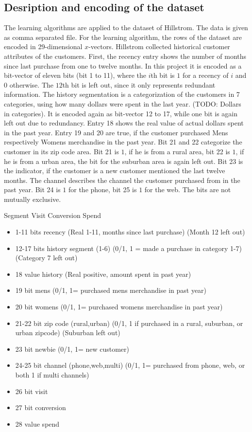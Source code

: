 \documentclass[10pt,twocolumn,letterpaper]{article}
\begin{document}
\subsection{Desription and encoding of the dataset}
The learning algorithms are applied to the dataset of Hillstrom. The data is given as comma separated file.
For the learning algorithm, the rows of the dataset are encoded in 29-dimensional $x$-vectors.
Hillstrom collected historical customer attributes of the customers.
First, the recency entry shows the number of months since last purchase from one to twelve months. In this project it is encoded as a bit-vector of eleven bits (bit 1 to 11), where the $i$th bit is $1$ for a recency of $i$ and $0$ otherwise. The $12$th bit is left out, since it only represents redundant information.
The history segmentation is a categorization of the customers in 7 categories, using how many dollars were spent in the last year.
(TODO: Dollars in categories). It is encoded again as bit-vector 12 to 17, while one bit is again left out due to redundancy.
Entry 18 shows the real value of actual dollars spent in the past year. Entry 19 and 20 are true, if the customer purchased Mens respectively  Womens merchandise in the past year. Bit 21 and 22 categorize the customer in its zip code area. Bit 21 is $1$, if he is from a rural area, bit 22 is $1$, if he is from a urban area, the bit for the suburban area is again left out.
Bit 23 is the indicator, if the customer is a new customer mentioned the last twelve months.
The channel describes the channel the customer purchased  from  in the past year. Bit 24 is $1$ for the phone, bit 25 is $1$ for the web. The bits are not mutually exclusive. 

Segment
Visit
Conversion
Spend

\begin{itemize}
\item 1-11 bits recency (Real 1-11, months since last purchase)  (Month 12 left out)
\item 12-17 bits history segment (1-6) (0/1, 1 = made a purchase in category 1-7)   (Category 7 left out)
\item  18 value history (Real positive, amount spent in past year)
\item  19 bit mens (0/1, 1= purchased mens merchandise in past year)
\item  20 bit womens (0/1, 1= purchased womens merchandise in past year)
\item  21-22 bit zip code (rural,urban) (0/1, 1 if purchased in a rural, suburban, or urban zipcode)  (Suburban left out)
\item  23 bit newbie (0/1, 1= new customer)
\item  24-25 bit channel (phone,web,multi) (0/1, 1= purchased from phone, web, or both 1 if multi channels)
\item 26 bit visit
\item 27 bit conversion
\item 28 value spend
\end{itemize}
\end{document}
